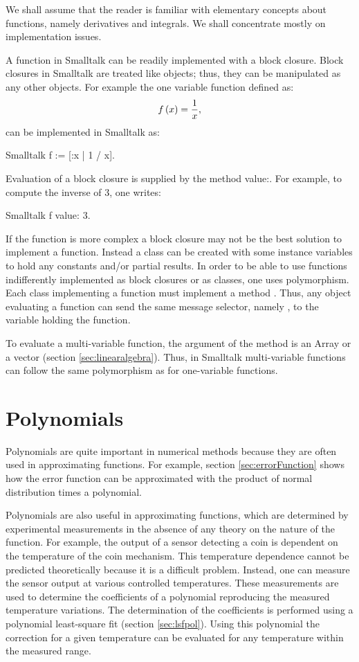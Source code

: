 We shall assume that the reader is familiar with elementary
concepts about functions, namely derivatives and integrals. We
shall concentrate mostly on implementation issues.

 A function in Smalltalk
can be readily implemented with a block closure. Block closures in
Smalltalk are treated like objects; thus, they can be manipulated
as any other objects. For example the one variable function
defined as:
\begin{equation}
f\left( x \right)={1 \over x},
\end{equation}
can be implemented in Smalltalk as:
\begin{displaycode}{Smalltalk}
f := [:x | 1 / x].
\end{displaycode}
Evaluation of a block closure is supplied by the method value:.
For example, to compute the inverse of 3, one writes:
\begin{displaycode}{Smalltalk}
f value: 3.
\end{displaycode}

If the function is more complex a block closure may not be the
best solution to implement a function. Instead a class can be
created with some instance variables to hold any constants and/or
partial results. In order to be able to use functions
indifferently implemented as block closures or as classes, one
uses polymorphism. Each class implementing a function must
implement a method .
Thus, any object evaluating a function can send the same message selector, namely , to the variable
holding the function.

To evaluate a multi-variable function, the argument of the method
 is an Array or a vector (\cf section
\ref{sec:linearalgebra}). Thus, in Smalltalk multi-variable
functions can follow the same polymorphism as for one-variable
functions.

\section{Polynomials}
\label{sec:polynomial}
 Polynomials are quite important in
numerical methods because they are often used in approximating
functions. For example, section \ref{sec:errorFunction} shows how
the error function can be approximated with the product of normal
distribution times a polynomial.

Polynomials are also useful in approximating functions, which are
determined by experimental measurements in the absence of any
theory on the nature of the function. For example, the output of a
sensor detecting a coin is dependent on the temperature of the
coin mechanism. This temperature dependence cannot be predicted
theoretically because it is a difficult problem. Instead, one can
measure the sensor output at various controlled temperatures.
These measurements are used to determine the coefficients of a
polynomial reproducing the measured temperature variations. The
determination of the coefficients is performed using a polynomial
least-square fit (\cf section \ref{sec:lsfpol}). Using this
polynomial the correction for a given temperature can be evaluated
for any temperature within the measured range.

